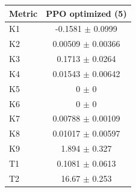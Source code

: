 \begin{tabular}{lc}
\toprule
Metric & PPO optimized (5) \\
\midrule
K1 & -0.1581 $\pm$ 0.0999 \\
K2 & 0.00509 $\pm$ 0.00366 \\
K3 & 0.1713 $\pm$ 0.0264 \\
K4 & 0.01543 $\pm$ 0.00642 \\
K5 & 0 $\pm$ 0 \\
K6 & 0 $\pm$ 0 \\
K7 & 0.00788 $\pm$ 0.00109 \\
K8 & 0.01017 $\pm$ 0.00597 \\
K9 & 1.894 $\pm$ 0.327 \\
T1 & 0.1081 $\pm$ 0.0613 \\
T2 & 16.67 $\pm$ 0.253 \\
\bottomrule
\end{tabular}

